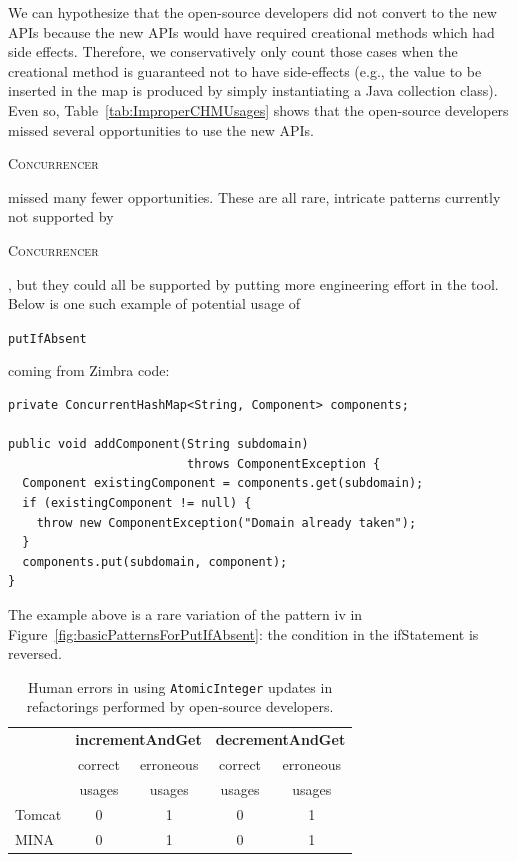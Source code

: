 \documentclass[10pt,twocolumn]{article}
\newcommand{\tool}{\begin{scriptsize}\textsc{Concurrencer}\end{scriptsize}\xspace}
\newcommand{\code}[1]{\begin{smaller}\texttt{#1}\end{smaller}}
\begin{document}
We can hypothesize that the open-source developers did not convert to the
new APIs because the new APIs would have required creational methods
which had side effects. Therefore, we conservatively only count those
cases when the creational method is guaranteed not to have
side-effects (e.g., the value to be inserted in the map is produced by simply
instantiating a Java collection class). Even so,
Table~\ref{tab:ImproperCHMUsages} shows that the open-source developers missed
several opportunities to use the new APIs. \tool missed many fewer
opportunities. These are all rare, intricate patterns currently not supported by
\tool, but they could all be supported by putting more engineering effort in
the tool. Below is one such example of potential usage of \code{putIfAbsent}
coming from Zimbra code:

\noindent
{\scriptsize
\begin{verbatim}
private ConcurrentHashMap<String, Component> components; 

public void addComponent(String subdomain) 
                         throws ComponentException {
  Component existingComponent = components.get(subdomain);
  if (existingComponent != null) {
    throw new ComponentException("Domain already taken");
  }
  components.put(subdomain, component);
}
\end{verbatim}
}
\noindent
The example above is a rare variation of the pattern iv in
Figure~\ref{fig:basicPatternsForPutIfAbsent}: the condition in the
ifStatement is reversed.
\begin{table}
\centering
\begin{scriptsize}
\begin{tabular}{l|cc|cc} 
         & \multicolumn{2}{|c|}{\textbf{incrementAndGet}} & \multicolumn{2}{|c}{\textbf{decrementAndGet}} \\ 
         & correct        & erroneous                     & correct        & erroneous                     \\ 
         & usages         &  usages                       & usages         & usages                        \\ \hline
  Tomcat &      0         &        1                      &        0       &     1                         \\
  MINA   &      0         &        1                      &        0       &     1                         \\
\end{tabular}
\caption{Human errors in using \texttt{AtomicInteger} updates in
refactorings performed by open-source developers.}
\label{tab:ImproperAIUsages}
\end{scriptsize}
\end{table}
\end{document}
